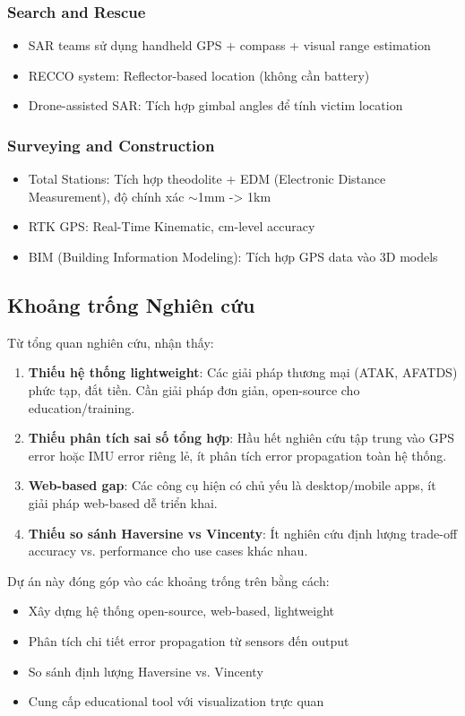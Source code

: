 \subsubsection{Search and Rescue}
\begin{itemize}
    \item SAR teams sử dụng handheld GPS + compass + visual range estimation
    \item RECCO system: Reflector-based location (không cần battery)
    \item Drone-assisted SAR: Tích hợp gimbal angles để tính victim location
\end{itemize}

\subsubsection{Surveying and Construction}
\begin{itemize}
    \item Total Stations: Tích hợp theodolite + EDM (Electronic Distance Measurement), độ chính xác $\sim$1mm -> 1km
    \item RTK GPS: Real-Time Kinematic, cm-level accuracy
    \item BIM (Building Information Modeling): Tích hợp GPS data vào 3D models
\end{itemize}

\subsection{Khoảng trống Nghiên cứu}

Từ tổng quan nghiên cứu, nhận thấy:

\begin{enumerate}
    \item \textbf{Thiếu hệ thống lightweight}: Các giải pháp thương mại (ATAK, AFATDS) phức tạp, đắt tiền. Cần giải pháp đơn giản, open-source cho education/training.
    
    \item \textbf{Thiếu phân tích sai số tổng hợp}: Hầu hết nghiên cứu tập trung vào GPS error hoặc IMU error riêng lẻ, ít phân tích error propagation toàn hệ thống.
    
    \item \textbf{Web-based gap}: Các công cụ hiện có chủ yếu là desktop/mobile apps, ít giải pháp web-based dễ triển khai.
    
    \item \textbf{Thiếu so sánh Haversine vs Vincenty}: Ít nghiên cứu định lượng trade-off accuracy vs. performance cho use cases khác nhau.
\end{enumerate}

Dự án này đóng góp vào các khoảng trống trên bằng cách:
\begin{itemize}
    \item Xây dựng hệ thống open-source, web-based, lightweight
    \item Phân tích chi tiết error propagation từ sensors đến output
    \item So sánh định lượng Haversine vs. Vincenty
    \item Cung cấp educational tool với visualization trực quan
\end{itemize}
